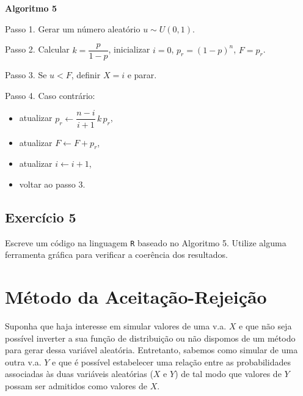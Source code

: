 \documentclass[
  letterpaper,
  DIV=11,
  numbers=noendperiod]{scrreprt}
\begin{document}
\begin{tcolorbox}[enhanced jigsaw, toprule=.15mm, arc=.35mm, colframe=quarto-callout-warning-color-frame, breakable, opacityback=0, rightrule=.15mm, bottomrule=.15mm, left=2mm, leftrule=.75mm, colback=white]

\vspace{-3mm}\textbf{Algoritmo 5}\vspace{3mm}

Passo 1. Gerar um número aleatório \(u \sim U(0,1)\).

Passo 2. Calcular \(k = \dfrac{p}{1-p}\), inicializar \(i = 0\),
\(p_r = (1-p)^n\), \(F = p_r\).

Passo 3. Se \(u < F\), definir \(X = i\) e parar.

Passo 4. Caso contrário:

\begin{itemize}
\item
  atualizar \(p_r \leftarrow \dfrac{n-i}{i+1}\,k\,p_r\),
\item
  atualizar \(F \leftarrow F + p_r\),
\item
  atualizar \(i \leftarrow i+1\),
\item
  voltar ao passo 3.
\end{itemize}

\end{tcolorbox}

\subsection*{Exercício 5}\label{exercuxedcio-5}

Escreve um código na linguagem \texttt{R} baseado no Algoritmo 5.
Utilize alguma ferramenta gráfica para verificar a coerência dos
resultados.

\section{Método da
Aceitação-Rejeição}\label{muxe9todo-da-aceitauxe7uxe3o-rejeiuxe7uxe3o}

Suponha que haja interesse em simular valores de uma v.a. \(X\) e que
não seja possível inverter a sua função de distribuição ou não dispomos
de um método para gerar dessa variável aleatória. Entretanto, sabemos
como simular de uma outra v.a. \(Y\) e que é possível estabelecer uma
relação entre as probabilidades associadas às duas variáveis aleatórias
(\(X\) e \(Y\)) de tal modo que valores de \(Y\) possam ser admitidos
como valores de \(X\).
\end{document}
